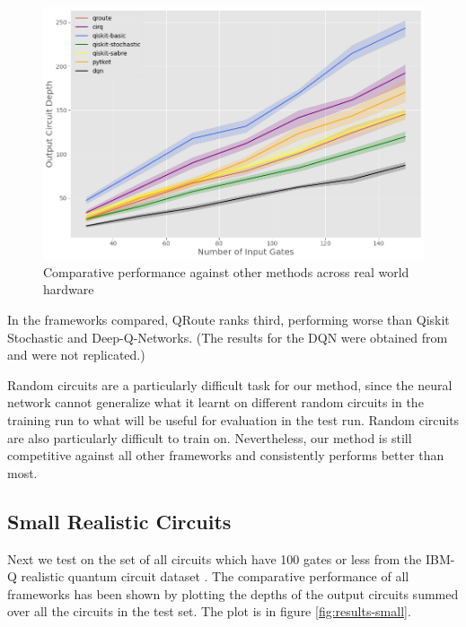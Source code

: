 \documentclass[%
 reprint,
 amsmath,amssymb,
 aps,
]{revtex4-2}
\begin{document}
\begin{figure}[t]
    \includegraphics[width=\linewidth]{images/results-random.png}
    \caption{\label{fig:results-random}
        Comparative performance against other methods across real world hardware}
\end{figure}

In the frameworks compared, QRoute ranks third, performing worse than Qiskit Stochastic and Deep-Q-Networks. {\small (The results for the DQN were obtained from \citet{qroute_dqn2} and were not replicated.)}

Random circuits are a particularly difficult task for our method, since the neural network cannot generalize what it learnt on different random circuits in the training run to what will be useful for evaluation in the test run. Random circuits are also particularly difficult to train on. Nevertheless, our method is still competitive against all other frameworks and consistently performs better than most.

\subsection{\label{sec:results-small}Small Realistic Circuits}

Next we test on the set of all circuits which have 100 gates or less from the IBM-Q realistic quantum circuit dataset \cite{}. The comparative performance of all frameworks has been shown by plotting the depths of the output circuits summed over all the circuits in the test set. The plot is in figure \ref{fig:results-small}.
\end{document}
